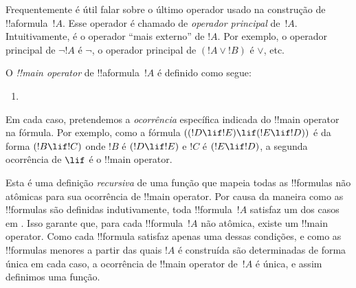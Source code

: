 \documentclass[../../../include/open-logic-section]{subfiles}
\begin{document}


\begin{explain}
Frequentemente é útil falar sobre o último operador usado na
construção de !!a{formula}~$!A$.  Esse operador é chamado de \emph{operador
  principal} de~$!A$. Intuitivamente, é o operador ``mais externo''
de $!A$. Por exemplo, o operador principal de $\lnot !A$ é $\lnot$,
o operador principal de $(!A \lor !B)$ é $\lor$, etc.
\end{explain}


\begin{defn}
O \emph{!!{main operator}} de !!a{formula}~$!A$ é
definido como segue:
\begin{enumerate}
\item {}







\end{enumerate}
\end{defn}

Em cada caso, pretendemos a \emph{ocorrência} específica indicada do
!!{main operator} na fórmula. Por exemplo, como a fórmula
$((!D \lif !E) \lif (!E \lif !D))$ é da forma $(!B \lif !C)$ onde
$!B$ é $(!D \lif !E)$ e $!C$ é $(!E \lif !D)$, a segunda
ocorrência de $\lif$ é o !!{main operator}.

\begin{explain}
Esta é uma definição \emph{recursiva} de uma função que mapeia todas as
!!{formula}s não atômicas para sua ocorrência de !!{main operator}. Por causa
da maneira como as !!{formula}s são definidas indutivamente, toda
!!{formula}~$!A$ satisfaz um dos casos em .
Isso garante que, para cada !!{formula}~$!A$ não atômica, existe um !!{main
  operator}. Como cada !!{formula} satisfaz apenas uma dessas
condições, e como as !!{formula}s menores a partir das quais $!A$ é
construída são determinadas de forma única em cada caso, a ocorrência de
!!{main operator} de~$!A$ é única, e assim definimos uma
função.
\end{explain}
\end{document}
